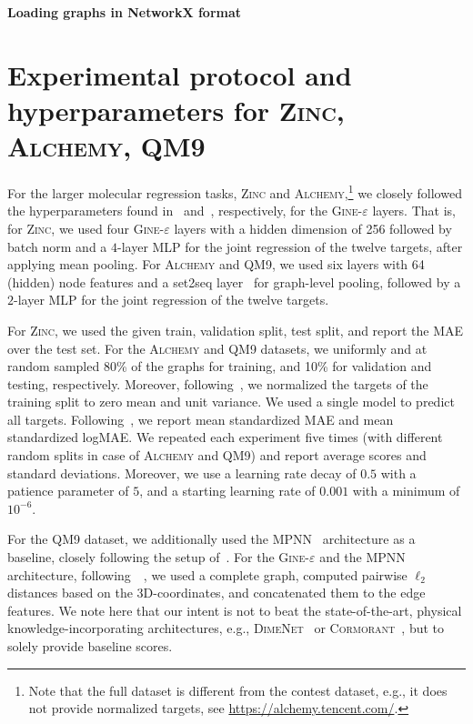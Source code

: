 \documentclass{article}
\newcommand{\xhdr}[1]{{\noindent\bfseries #1}}
\theoremstyle{definition}
\begin{document}
\xhdr{Loading graphs in NetworkX format}


\section{Experimental protocol and hyperparameters for \textsc{Zinc}, \textsc{Alchemy}, \textsc{QM9}}\label{eval}
For the larger molecular regression tasks, \textsc{Zinc} and \textsc{Alchemy},\footnote{Note that the full dataset is different from the contest dataset, e.g., it does not provide normalized targets, see \url{https://alchemy.tencent.com/}.} we closely followed the hyperparameters found in~\cite{Dwi+2020} and~\cite{Che+2020}, respectively, for the \textsc{Gine-$\varepsilon$} layers. That is, for \textsc{Zinc}, we used four \textsc{Gine-$\varepsilon$} layers with a hidden dimension of 256 followed by batch norm and a $4$-layer MLP for the joint regression of the twelve targets, after applying mean pooling. For \textsc{Alchemy} and \textsc{QM9}, we used six layers with 64 (hidden) node features and a set2seq layer~\cite{Vin+2016} for graph-level pooling, followed by a $2$-layer MLP for the joint regression of the twelve targets.

For \textsc{Zinc}, we used the given train, validation split, test split, and report the MAE over the test set. For the \textsc{Alchemy} and \textsc{QM9} datasets, we uniformly and at random sampled 80\% of the graphs for training, and 10\% for validation and testing, respectively. Moreover, following~\cite{Che+2020,Gil+2017}, we normalized the targets of the training split to zero mean and unit variance. We used a single model to predict all targets. Following~\cite{Kli+2020}, we report mean standardized MAE and mean standardized logMAE. We repeated each experiment five times (with different random splits in case of \textsc{Alchemy} and \textsc{QM9}) and report average scores and standard deviations.  Moreover, we use a learning rate decay of $0.5$ with a patience parameter of $5$, and a starting learning rate of $0.001$ with a minimum of $10^{-6}$.

For the \textsc{QM9} dataset, we additionally used the \textsc{MPNN}~\cite{Gil+2017} architecture as a baseline, closely following the setup of~\cite{Gil+2017}. For the \textsc{Gine-$\varepsilon$}  and the \textsc{MPNN} architecture, following~\citeauthor{Gil+2017}~\cite{Gil+2017}, we used a complete graph, computed pairwise $\ell_2$ distances based on the 3D-coordinates, and concatenated them to the edge features. We note here that our intent is not to beat the state-of-the-art, physical knowledge-incorporating architectures, e.g., \textsc{DimeNet}~\cite{Kli+2020} or \textsc{Cormorant}~\cite{And+2019}, but to solely provide baseline scores. 
\end{document}
